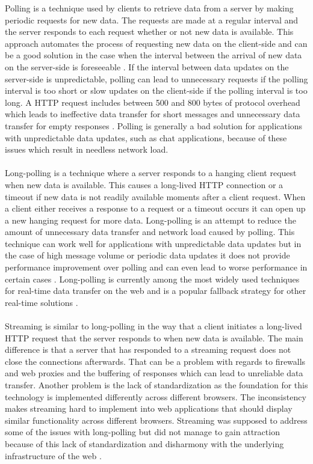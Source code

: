 Polling is a technique used by clients to retrieve data from a server by making periodic requests for new data. The requests are made at a regular interval and the server responds to each request whether or not new data is available. This approach automates the process of requesting new data on the client-side and can be a good solution in the case when the interval between the arrival of new data on the server-side is foreseeable \cite{pimentel2012communicating}. If the interval between data updates on the server-side is unpredictable, polling can lead to unnecessary requests if the polling interval is too short or slow updates on the client-side if the polling interval is too long. A HTTP request includes between 500 and 800 bytes of protocol overhead which leads to ineffective data transfer for short messages and unnecessary data transfer for empty responses \cite{grigorik2013high}. Polling is generally a bad solution for applications with unpredictable data updates, such as chat applications, because of these issues which result in needless network load.
\\ \\
Long-polling is a technique where a server responds to a hanging client request when new data is available. This causes a long-lived HTTP connection or a timeout if new data is not readily available moments after a client request. When a client either receives a response to a request or a timeout occurs it can open up a new hanging request for more data. Long-polling is an attempt to reduce the amount of unnecessary data transfer and network load caused by polling. This technique can work well for applications with unpredictable data updates but in the case of high message volume or periodic data updates it does not provide performance improvement over polling and can even lead to worse performance in certain cases \cite{loreto2011known}. Long-polling is currently among the most widely used techniques for real-time data transfer on the web and is a popular fallback strategy for other real-time solutions \cite{modernizr}.
\\ \\
Streaming is similar to long-polling in the way that a client initiates a long-lived HTTP request that the server responds to when new data is available. The main difference is that a server that has responded to a streaming request does not close the connections afterwards. That can be a problem with regards to firewalls and web proxies and the buffering of responses which can lead to unreliable data transfer. Another problem is the lack of standardization as the foundation for this technology is implemented differently across different browsers. The inconsistency makes streaming hard to implement into web applications that should display similar functionality across different browsers. Streaming was supposed to address some of the issues with long-polling but did not manage to gain attraction because of this lack of standardization and disharmony with the underlying infrastructure of the web \cite{grigorik2013high}.
